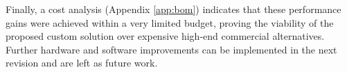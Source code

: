 Finally, a cost analysis (Appendix \ref{app:bom}) indicates that these performance gains were achieved within
a very limited budget, proving the viability of the proposed custom solution over expensive high-end commercial
alternatives. Further hardware and software improvements can be implemented in the next revision and are left
as future work.